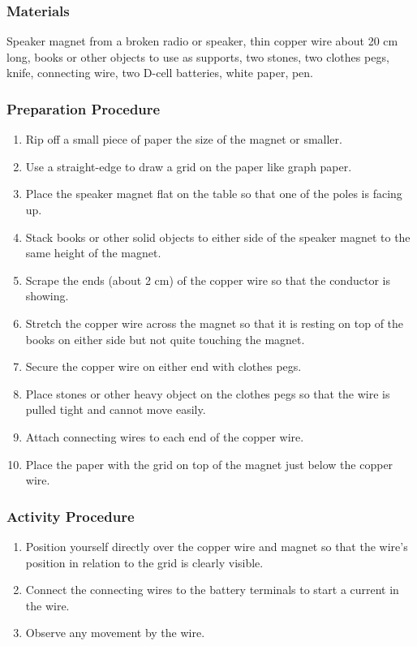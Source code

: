 \subsubsection*{Materials}
Speaker magnet from a broken radio or speaker, thin copper wire about 20 cm long, books or other objects to use as supports, two stones, two clothes pegs, knife, connecting wire, two D-cell batteries, white paper, pen.  

\subsubsection*{Preparation Procedure}
\begin{enumerate}
\item{Rip off a small piece of paper the size of the magnet or smaller.} 
\item{Use a straight-edge to draw a grid on the paper like graph paper.} 
\item{Place the speaker magnet flat on the table so that one of the poles is facing up.} 
\item{Stack books or other solid objects to either side of the speaker magnet to the same height of the magnet.} 
\item{Scrape the ends (about 2 cm) of the copper wire so that the conductor is showing.} 
\item{Stretch the copper wire across the magnet so that it is resting on top of the books on either side but not quite touching the magnet.} 
\item{Secure the copper wire on either end with clothes pegs.} 
\item{Place stones or other heavy object on the clothes pegs so that the wire is pulled tight and cannot move easily.} 
\item{Attach connecting wires to each end of the copper wire.} 
\item{Place the paper with the grid on top of the magnet just below the copper wire.} 
\end{enumerate}

\subsubsection*{Activity Procedure}
\begin{enumerate}
\item{Position yourself directly over the copper wire and magnet so that the wire's position in relation to the grid is clearly visible.} 
\item{Connect the connecting wires to the battery terminals to start a current in the wire.} 
\item{Observe any movement by the wire.} 
\end{enumerate}

